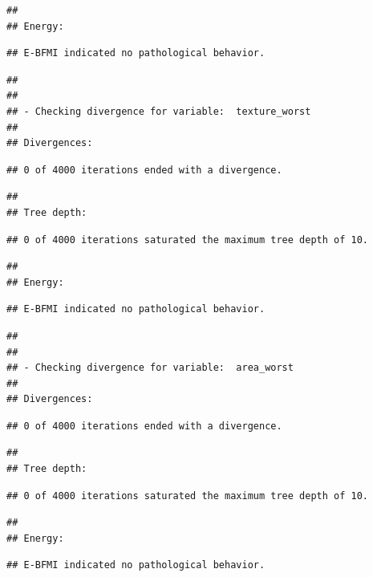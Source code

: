 \documentclass[
]{article}
\begin{document}
\begin{verbatim}
## 
## Energy:
\end{verbatim}

\begin{verbatim}
## E-BFMI indicated no pathological behavior.
\end{verbatim}

\begin{verbatim}
## 
## 
## - Checking divergence for variable:  texture_worst 
## 
## Divergences:
\end{verbatim}

\begin{verbatim}
## 0 of 4000 iterations ended with a divergence.
\end{verbatim}

\begin{verbatim}
## 
## Tree depth:
\end{verbatim}

\begin{verbatim}
## 0 of 4000 iterations saturated the maximum tree depth of 10.
\end{verbatim}

\begin{verbatim}
## 
## Energy:
\end{verbatim}

\begin{verbatim}
## E-BFMI indicated no pathological behavior.
\end{verbatim}

\begin{verbatim}
## 
## 
## - Checking divergence for variable:  area_worst 
## 
## Divergences:
\end{verbatim}

\begin{verbatim}
## 0 of 4000 iterations ended with a divergence.
\end{verbatim}

\begin{verbatim}
## 
## Tree depth:
\end{verbatim}

\begin{verbatim}
## 0 of 4000 iterations saturated the maximum tree depth of 10.
\end{verbatim}

\begin{verbatim}
## 
## Energy:
\end{verbatim}

\begin{verbatim}
## E-BFMI indicated no pathological behavior.
\end{verbatim}
\end{document}
